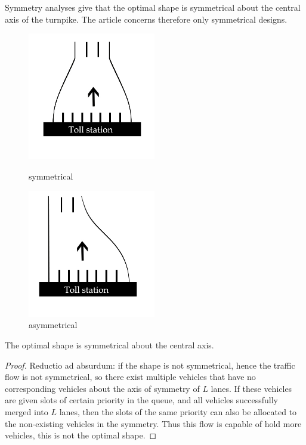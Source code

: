\documentclass{mcmthesis}
\begin{document}
Symmetry analyses give that the optimal shape is symmetrical about the central axis of the turnpike. The article concerns therefore only symmetrical designs.
\begin{figure}[H]
	\begin{minipage}[t]{0.5\linewidth}
		\centering
		\includegraphics[width=2.2in]{symmetrical.jpg}
		\caption{symmetrical}
		\label{symmetrical}
	\end{minipage}%
	\begin{minipage}[t]{0.5\linewidth}
		\centering
		\includegraphics[width=2.2in]{asymmetrical.jpg}
		\caption{asymmetrical}
		\label{asymmetrical}
	\end{minipage}
\end{figure}


\begin{Theorem} \label{thm:yingsongsheng}
The optimal shape is symmetrical about the central axis.
\end{Theorem}
\begin{proof}
Reductio ad absurdum: if the shape is not symmetrical, hence the traffic flow is not symmetrical, so there exist multiple vehicles that have no corresponding vehicles about the axis of symmetry of $L$ lanes. If these vehicles are given slots of certain priority in the queue, and all vehicles successfully merged into $L$ lanes, then the slots of the same priority can also be allocated to the non-existing vehicles in the symmetry. Thus this flow is capable of hold more vehicles, this is not the optimal shape.
\end{proof}
\end{document}
